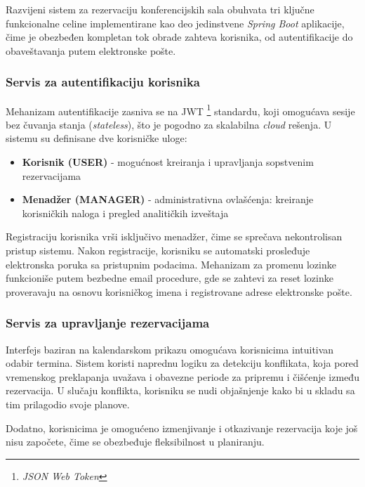 \documentclass[12pt]{article}
\begin{document}
    Razvijeni sistem za rezervaciju konferencijskih sala obuhvata tri ključne funkcionalne celine implementirane kao deo jedinstvene \textit{Spring Boot} aplikacije, čime je obezbeđen kompletan tok obrade zahteva korisnika, od autentifikacije do obaveštavanja putem elektronske pošte.

    \subsubsection{Servis za autentifikaciju korisnika}

    Mehanizam autentifikacije zasniva se na JWT \footnote{\textit{JSON Web Token}} standardu, koji 
    omogućava sesije bez čuvanja stanja (\textit{stateless}), što je pogodno za skalabilna 
    \textit{cloud} rešenja. U sistemu su definisane dve korisničke uloge:
    \begin{itemize}
    \item \textbf{Korisnik (USER)} - mogućnost kreiranja i upravljanja sopstvenim rezervacijama
    \item \textbf{Menadžer (MANAGER)} - administrativna ovlašćenja: kreiranje korisničkih naloga i pregled analitičkih izveštaja
    \end{itemize}

    Registraciju korisnika vrši isključivo menadžer, čime se sprečava nekontrolisan pristup sistemu. Nakon registracije, korisniku se automatski prosleđuje elektronska poruka sa pristupnim podacima. Mehanizam za promenu lozinke funkcioniše putem bezbedne email procedure, gde se zahtevi za reset lozinke proveravaju na osnovu korisničkog imena i registrovane adrese elektronske pošte.

    \newpage
    \subsubsection{Servis za upravljanje rezervacijama}

    Interfejs baziran na kalendarskom prikazu omogućava korisnicima intuitivan odabir termina. Sistem 
    koristi naprednu logiku za detekciju konflikata, koja pored vremenskog preklapanja uvažava i 
    obavezne periode za pripremu i čišćenje između rezervacija. U slučaju konflikta, korisniku se 
    nudi objašnjenje kako bi u skladu sa tim prilagodio svoje planove.

    Dodatno, korisnicima je omogućeno izmenjivanje i otkazivanje rezervacija koje još nisu započete, čime se obezbeđuje fleksibilnost u planiranju.
\end{document}
